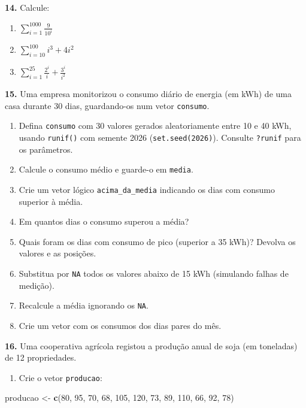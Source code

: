 \documentclass[
  portuguese,
  11pt,
  openany]{book}
\newenvironment{Shaded}{\begin{snugshade}}{\end{snugshade}}
\newcommand{\DecValTok}[1]{\textcolor[rgb]{0.00,0.00,0.81}{#1}}
\newcommand{\FunctionTok}[1]{\textcolor[rgb]{0.13,0.29,0.53}{\textbf{#1}}}
\newcommand{\NormalTok}[1]{#1}
\newcommand{\OtherTok}[1]{\textcolor[rgb]{0.56,0.35,0.01}{#1}}
\providecommand{\tightlist}{%
  \setlength{\itemsep}{0pt}\setlength{\parskip}{0pt}}
\begin{document}
\textbf{14.} Calcule:

\begin{enumerate}
\def\labelenumi{(\alph{enumi})}
\tightlist
\item
  \(\displaystyle\sum_{i=1}^{1000} \frac{9}{10^{i}}\)
\item
  \(\displaystyle\sum_{i=10}^{100} i^{3} + 4i^{2}\)
\item
  \(\displaystyle\sum_{i=1}^{25} \frac{2^{i}}{i} + \frac{3^{i}}{i^2}\)
\end{enumerate}

\textbf{15.} Uma empresa monitorizou o consumo diário de energia (em kWh) de uma casa
durante 30 dias, guardando-os num vetor \texttt{consumo}.

\begin{enumerate}
\def\labelenumi{(\alph{enumi})}
\tightlist
\item
  Defina \texttt{consumo} com 30 valores gerados aleatoriamente entre 10 e 40 kWh,
  usando \texttt{runif()} com semente 2026 (\texttt{set.seed(2026)}). Consulte \texttt{?runif} para
  os parâmetros.
\item
  Calcule o consumo médio e guarde-o em \texttt{media}.
\item
  Crie um vetor lógico \texttt{acima\_da\_media} indicando os dias com consumo superior à
  média.
\item
  Em quantos dias o consumo superou a média?
\item
  Quais foram os dias com consumo de pico (superior a 35 kWh)? Devolva os
  valores e as posições.
\item
  Substitua por \texttt{NA} todos os valores abaixo de 15 kWh (simulando falhas de
  medição).
\item
  Recalcule a média ignorando os \texttt{NA}.
\item
  Crie um vetor com os consumos dos dias pares do mês.
\end{enumerate}

\textbf{16.} Uma cooperativa agrícola registou a produção anual de soja (em toneladas)
de 12 propriedades.

\begin{enumerate}
\def\labelenumi{(\alph{enumi})}
\tightlist
\item
  Crie o vetor \texttt{producao}:
\end{enumerate}

\begin{Shaded}
\begin{Highlighting}[]
\NormalTok{producao }\OtherTok{\textless{}{-}} \FunctionTok{c}\NormalTok{(}\DecValTok{80}\NormalTok{, }\DecValTok{95}\NormalTok{, }\DecValTok{70}\NormalTok{, }\DecValTok{68}\NormalTok{, }\DecValTok{105}\NormalTok{, }\DecValTok{120}\NormalTok{, }\DecValTok{73}\NormalTok{, }\DecValTok{89}\NormalTok{, }\DecValTok{110}\NormalTok{, }\DecValTok{66}\NormalTok{, }\DecValTok{92}\NormalTok{, }\DecValTok{78}\NormalTok{)}
\end{Highlighting}
\end{Shaded}
\end{document}
